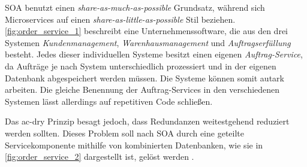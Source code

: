     SOA benutzt einen \emph{share-as-much-as-possible} Grundsatz, während sich Microservices auf einen \emph{share-as-little-as-possible} Stil beziehen. \autoref{fig:order_service_1} beschreibt eine Unternehmenssoftware, die aus den drei Systemen \emph{Kundenmanagement}, \emph{Warenhausmanagement} und \emph{Auftragserfüllung} besteht. Jedes dieser individuellen Systeme besitzt einen eigenen \emph{Auftrag-Service}, da Aufträge je nach System unterschiedlich prozessiert und in der eigenen Datenbank abgespeichert werden müssen. Die Systeme können somit autark arbeiten. Die gleiche Benennung der Auftrag-Services in den verschiedenen Systemen lässt allerdings auf repetitiven Code schließen.
    
    Das \gls{ac-dry} Prinzip besagt jedoch, dass Redundanzen weitestgehend reduziert werden sollten. Dieses Problem soll nach SOA durch eine geteilte Servicekomponente mithilfe von kombinierten Datenbanken, wie sie in \autoref{fig:order_service_2} dargestellt ist, gelöst werden \parencites{richards2016msavssoa}{thomas2019pragmatic}.

